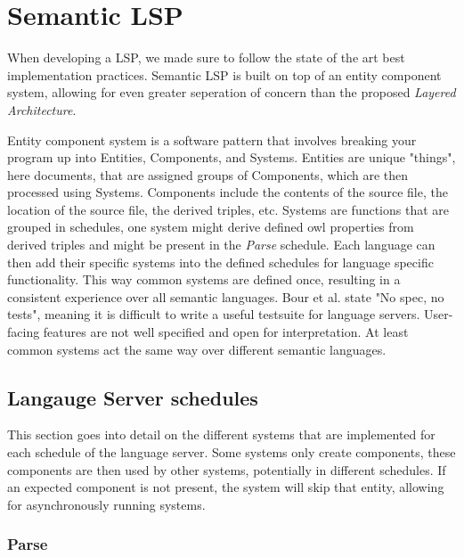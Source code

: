 \section{Semantic LSP}%
\label{sec:semantic_lsp}

When developing a LSP, we made sure to follow the state of the art best implementation practices\cite{10.1145/3550355.3552452,10.1145/3563834.3567537,10.1145/3550355.3552452,Bour_2018}.
Semantic LSP is built on top of an entity component system, allowing for even greater seperation of concern than the proposed \textit{Layered Architecture}\cite{10.1145/3550355.3552452}.

Entity component system is a software pattern that involves breaking your program up into Entities, Components, and Systems.
Entities are unique "things", here documents, that are assigned groups of Components, which are then processed using Systems.
Components include the contents of the source file, the location of the source file, the derived triples, etc.
Systems are functions that are grouped in schedules, one system might derive defined owl properties from derived triples and might be present in the \textit{Parse} schedule.
Each language can then add their specific systems into the defined schedules for language specific functionality.
This way common systems are defined once, resulting in a consistent experience over all semantic languages.
Bour et al. state "No spec, no tests"\cite{Bour_2018}, meaning it is difficult to write a useful testsuite for language servers.
User-facing features are not well specified and open for interpretation.
At least common systems act the same way over different semantic languages.

\subsection{Langauge Server schedules}

This section goes into detail on the different systems that are implemented for each schedule of the language server.
Some systems only create components, these components are then used by other systems, potentially in different schedules.
If an expected component is not present, the system will skip that entity, allowing for asynchronously running systems.

\subsubsection*{Parse}

